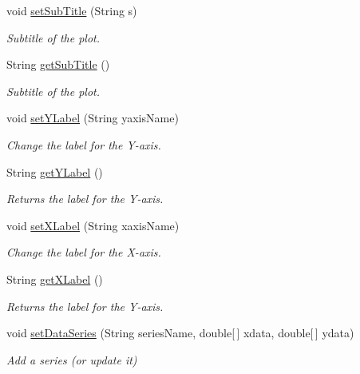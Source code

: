 \begin{DoxyCompactItemize}
void \mbox{\hyperlink{classbridges_1_1base_1_1_line_chart_ad24bfdd49194f8e152fdb80e039762ad}{set\+Sub\+Title}} (String s)
\begin{DoxyCompactList}\small\item\em Subtitle of the plot. \end{DoxyCompactList}\item 
String \mbox{\hyperlink{classbridges_1_1base_1_1_line_chart_a102006e90f2a226886538db0eeda6b08}{get\+Sub\+Title}} ()
\begin{DoxyCompactList}\small\item\em Subtitle of the plot. \end{DoxyCompactList}\item 
void \mbox{\hyperlink{classbridges_1_1base_1_1_line_chart_adddccbe77ebd2590f426fab9c8227457}{set\+Y\+Label}} (String yaxis\+Name)
\begin{DoxyCompactList}\small\item\em Change the label for the Y-\/axis. \end{DoxyCompactList}\item 
String \mbox{\hyperlink{classbridges_1_1base_1_1_line_chart_ad3ae17da720b1f89406ab742379ddfd6}{get\+Y\+Label}} ()
\begin{DoxyCompactList}\small\item\em Returns the label for the Y-\/axis. \end{DoxyCompactList}\item 
void \mbox{\hyperlink{classbridges_1_1base_1_1_line_chart_ab402a1134bb79919860368a234f62ea2}{set\+X\+Label}} (String xaxis\+Name)
\begin{DoxyCompactList}\small\item\em Change the label for the X-\/axis. \end{DoxyCompactList}\item 
String \mbox{\hyperlink{classbridges_1_1base_1_1_line_chart_a0885f5c62f950d96397b1704da6e2798}{get\+X\+Label}} ()
\begin{DoxyCompactList}\small\item\em Returns the label for the Y-\/axis. \end{DoxyCompactList}\item 
void \mbox{\hyperlink{classbridges_1_1base_1_1_line_chart_a586e9953b13e51ab9e592acfb034887b}{set\+Data\+Series}} (String series\+Name, double\mbox{[}$\,$\mbox{]} xdata, double\mbox{[}$\,$\mbox{]} ydata)
\begin{DoxyCompactList}\small\item\em Add a series (or update it) \end{DoxyCompactList}\item 

\end{DoxyCompactItemize}
